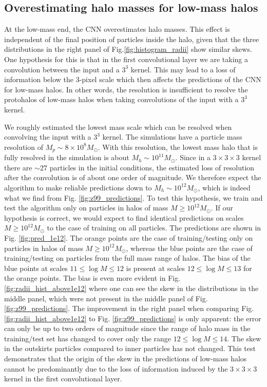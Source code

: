 \documentclass[11pt]{article}
\begin{document}
\subsection{Overestimating halo masses for low-mass halos}

At the low-mass end, the CNN overestimates halo masses. This effect is independent of the final position of particles inside the halo, given that the three distributions in the right panel of Fig.\ref{fig:histogram_radii} show similar skews. One hypothesis for this is that in the first convolutional layer we are taking a convolution between the input and a $3^3$ kernel. This may lead to a loss of information below the 3-pixel scale which then affects the predictions of the CNN for low-mass halos. In other words, the resolution is insufficient to resolve the protohalos of low-mass halos when taking convolutions of the input with a $3^3$ kernel.

We roughly estimated the lowest mass scale which can be resolved when convolving the input with a $3^3$ kernel. The simulations have a particle mass resolution of $M_p \sim 8 \times 10^8 M_\odot$. With this resolution, the lowest mass halo that is fully resolved in the simulation is about $M_h \sim 10^{11} M_\odot$. Since in a $3\times 3\times 3$ kernel there are $\sim 27$ particles in the initial conditions, the estimated loss of resolution after the convolution is of about one order of magnitude. We therefore expect the algorithm to make reliable predictions down to $M_h \sim 10^{12} M_\odot$, which is indeed what we find from Fig. \ref{fig:z99_predictions}. To test this hypothesis, we train and test the algorithm only on particles in halos of mass $M\geq 10^{12} M_\odot$. If our hypothesis is correct, we would expect to find identical predictions on scales $M\geq 10^{12} M_\odot$ to the case of training on all particles. The predictions are shown in Fig. \ref{fig:pred_1e12}. The orange points are the case of training/testing only on particles in halos of mass $M\geq 10^{12} M_\odot$, whereas the blue points are the case of training/testing on particles from the full mass range of halos. The bias of the blue points at scales $11 \leq \log M \leq 12$ is present at scales $12 \leq \log M \leq 13$ for the orange points. The bias is even more evident in Fig. \ref{fig:radii_hist_above1e12} where one can see the skew in the distributions in the middle panel, which were not present in the middle panel of Fig. \ref{fig:z99_predictions}. The improvement in the right panel when comparing Fig. \ref{fig:radii_hist_above1e12} to Fig. \ref{fig:z99_predictions} is only apparent: the error can only be up to two orders of magnitude since the range of halo mass in the training/test set has changed to cover only the range $12 \leq \log M \leq 14$. The skew in the outskirts particles compared to inner particles has not changed. This test demonstrates that the origin of the skew in the predictions of low-mass halos cannot be predominantly due to the loss of information induced by the $3\times 3\times 3$ kernel in the first convolutional layer.
\end{document}
